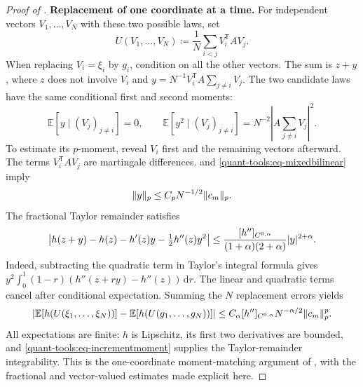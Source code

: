 \documentclass[11pt,reqno]{amsart}
\numberwithin{equation}{section}
\theoremstyle{plain}
\theoremstyle{remark}
\DeclarePairedDelimiter{\abs}{\lvert}{\rvert}
\DeclarePairedDelimiter{\norm}{\lVert}{\rVert}
\newcommand{\md}{\mathrm{d}}
\newcommand{\E}{{\mathbb{E}}}
\newcommand{\step}[1]{\par\medskip\noindent\textbf{#1}}
\begin{document}
\begin{proof}[Proof of ]
\step{Replacement of one coordinate at a time.}
For independent vectors $V_1,\ldots,V_N$ with these two possible laws, set
\begin{equation}\label{quant-tools:eq-quadraticfinite}
 U(V_1,\ldots,V_N)\coloneqq\frac1N\sum_{i<j}V_i^{\mathsf T}AV_j.
\end{equation}
When replacing $V_i=\xi_i$ by $g_i$, condition on all the other vectors.
The sum is $z+y$, where $z$ does not involve $V_i$ and
$y=N^{-1}V_i^{\mathsf T}A\sum_{j\ne i}V_j$.  The two candidate laws have
the same conditional first and second moments:
\begin{equation}\label{quant-tools:eq-matching}
 \E[y\mid(V_j)_{j\ne i}]=0,\qquad
 \E[y^2\mid(V_j)_{j\ne i}]
 =N^{-2}\left|A\sum_{j\ne i}V_j\right|^2.
\end{equation}
To estimate its $p$-moment, reveal $V_i$ first and the remaining vectors
afterward.  The terms $V_i^{\mathsf T}AV_j$ are martingale differences.
 and
\eqref{quant-tools:eq-mixedbilinear} imply
\begin{equation}\label{quant-tools:eq-incrementmoment}
 \norm y_p\leq C_pN^{-1/2}\norm{c_m}_p.
\end{equation}
The fractional Taylor remainder satisfies
\begin{equation}\label{eq:signed-smooth-Taylor-remainder}
 \left|h(z+y)-h(z)-h'(z)y-\tfrac12h''(z)y^2\right|
 \leq\frac{[h'']_{C^{0,\alpha}}}{(1+\alpha)(2+\alpha)}\abs y^{2+\alpha}.
\end{equation}
Indeed, subtracting the quadratic term in Taylor's integral formula gives
$y^2\int_0^1(1-r)(h''(z+ry)-h''(z))\,\md r$.
The linear and quadratic terms cancel after conditional expectation.
Summing the $N$ replacement errors yields
\begin{equation}\label{eq:signed-smooth-Lindeberg}
 \left|\E[h(U(\xi_1,\ldots,\xi_N))]
       -\E[h(U(g_1,\ldots,g_N))]\right|
 \leq C_\alpha[h'']_{C^{0,\alpha}}N^{-\alpha/2}\norm{c_m}_p^p.
\end{equation}
All expectations are finite: $h$ is Lipschitz, its first two derivatives
are bounded, and \eqref{quant-tools:eq-incrementmoment} supplies the
Taylor-remainder integrability.  This is the one-coordinate moment-matching
argument of \cite[Section~2]{Chatterjee2006}, with the fractional and
vector-valued estimates made explicit here.


\end{proof}
\end{document}
